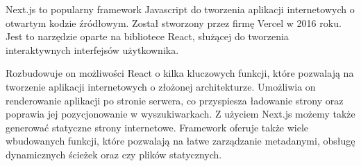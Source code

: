 Next.js to popularny framework Javascript do tworzenia aplikacji internetowych o otwartym kodzie źródłowym. Został stworzony przez firmę Vercel w 2016 roku. Jest to narzędzie oparte na bibliotece React, służącej do tworzenia interaktywnych interfejsów użytkownika.

Rozbudowuje on możliwości React o kilka kluczowych funkcji, które pozwalają na tworzenie aplikacji internetowych o złożonej architekturze. Umożliwia on renderowanie aplikacji po stronie serwera, co przyspiesza ładowanie strony oraz poprawia jej pozycjonowanie w wyszukiwarkach. Z użyciem Next.js możemy także generować statyczne strony internetowe. Framework oferuje także wiele wbudowanych funkcji, które pozwalają na łatwe zarządzanie metadanymi, obsługę dynamicznych ścieżek oraz czy plików statycznych. \autocite{nextjs}
